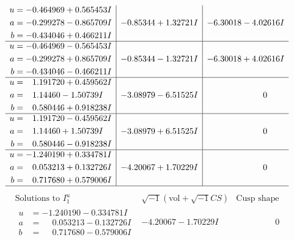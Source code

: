 \documentclass[1p]{elsarticle_modified}
\theoremstyle{definition}
\newcommand{\I}{\sqrt{-1}}
\begin{document}
$$\begin{array}{c|c|c}
\begin{aligned}
u &= -0.464969 + 0.565453 I \\
a &= -0.299278 - 0.865709 I \\
b &= -0.434046 + 0.466211 I\end{aligned}
 & -0.85344 + 1.32721 I & -6.30018 - 4.02616 I \\ \hline\begin{aligned}
u &= -0.464969 - 0.565453 I \\
a &= -0.299278 + 0.865709 I \\
b &= -0.434046 - 0.466211 I\end{aligned}
 & -0.85344 - 1.32721 I & -6.30018 + 4.02616 I \\ \hline\begin{aligned}
u &= \phantom{-}1.191720 + 0.459562 I \\
a &= \phantom{-}1.14460 - 1.50739 I \\
b &= \phantom{-}0.580446 + 0.918238 I\end{aligned}
 & -3.08979 - 6.51525 I & \phantom{-0.000000 } 0 \\ \hline\begin{aligned}
u &= \phantom{-}1.191720 - 0.459562 I \\
a &= \phantom{-}1.14460 + 1.50739 I \\
b &= \phantom{-}0.580446 - 0.918238 I\end{aligned}
 & -3.08979 + 6.51525 I & \phantom{-0.000000 } 0 \\ \hline\begin{aligned}
u &= -1.240190 + 0.334781 I \\
a &= \phantom{-}0.053213 + 0.132726 I \\
b &= \phantom{-}0.717680 + 0.579006 I\end{aligned}
 & -4.20067 + 1.70229 I & \phantom{-0.000000 } 0\\
 \hline 
 \end{array}$$\newpage$$\begin{array}{c|c|c}  
\text{Solutions to }I^u_{1}& \I (\text{vol} + \sqrt{-1}CS) & \text{Cusp shape}\\
 \hline 
\begin{aligned}
u &= -1.240190 - 0.334781 I \\
a &= \phantom{-}0.053213 - 0.132726 I \\
b &= \phantom{-}0.717680 - 0.579006 I\end{aligned}
 & -4.20067 - 1.70229 I & \phantom{-0.000000 } 0 \\ \hline\begin{aligned}

\end{aligned}
\end{array}$$
\end{document}
